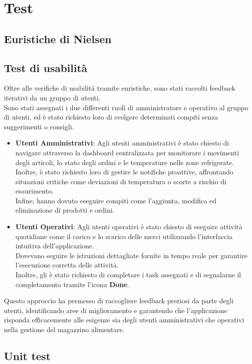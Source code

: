 \section{Test}
\subsection{Euristiche di Nielsen}
\subsection{Test di usabilità}
Oltre alle verifiche di usabilità tramite euristiche, sono stati raccolti feedback iterativi da un gruppo di utenti.\\
Sono stati assegnati i due differenti ruoli di amministratore e operativo al gruppo di utenti, ed è stato richiesto
loro di svolgere determinati compiti senza suggerimenti o consigli.\\

\begin{itemize}
    \item \textbf{Utenti Amministrativi}: Agli utenti amministrativi è stato chiesto di navigare attraverso la dashboard centralizzata per monitorare i movimenti degli articoli, lo stato degli ordini e le temperature nelle zone refrigerate.\\ Inoltre, è stato richiesto loro di gestire le notifiche proattive, affrontando situazioni critiche come deviazioni di temperatura o scorte a rischio di esaurimento.\\ Infine, hanno dovuto eseguire compiti come l'aggiunta, modifica ed eliminazione di prodotti e ordini.

    \item \textbf{Utenti Operativi}: Agli utenti operativi è stato chiesto di eseguire attività quotidiane come il carico e lo scarico delle merci utilizzando l'interfaccia intuitiva dell'applicazione.\\ Dovevano seguire le istruzioni dettagliate fornite in tempo reale per garantire l'esecuzione corretta delle attività.\\ Inoltre, gli è stato richiesto di completare i task assegnati e di segnalarne il completamento tramite l'icona \textbf{Done}.
\end{itemize}

Questo approccio ha permesso di raccogliere feedback preziosi da parte degli utenti, identificando aree di
miglioramento e garantendo che l'applicazione risponda efficacemente alle esigenze sia degli utenti amministrativi
che operativi nella gestione del magazzino alimentare.
\subsection{Unit test}